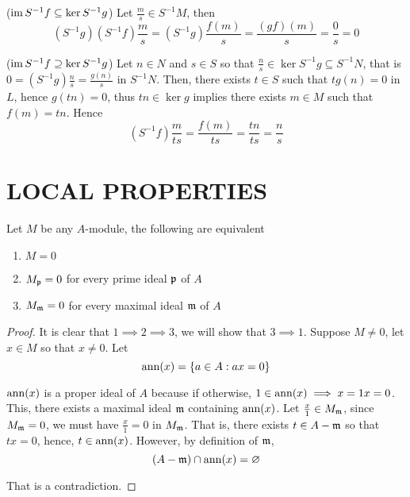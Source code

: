 \begin{longproof}
	($\operatorname{im} S^{-1} f \subseteq \ker S^{-1} g$) Let $\frac{m}{s} \in S^{-1} M$, then 
	$$
		(S^{-1} g) (S^{-1} f)\frac{m}{s} = (S^{-1} g) \frac{f(m)}{s} = \frac{(gf)(m)}{s} = \frac{0}{s} = 0
	$$
	
	($\operatorname{im} S^{-1} f \supseteq \ker S^{-1} g$) Let $n \in N$ and $s \in S$ so that $\frac{n}{s} \in \ker S^{-1} g \subseteq S^{-1} N$, that is $0 = (S^{-1} g) \frac{n}{s} = \frac{g(n)}{s}$ in $S^{-1} N$. Then, there exists $t \in S$ such that $t g(n) = 0$ in $L$, hence $g(tn) = 0$, thus $tn \in \ker g$ implies there exists $m \in M$ such that $f(m) = tn$. Hence
	$$
		(S^{-1} f) \frac{m}{ts} = \frac{f(m)}{ts} = \frac{tn}{ts} = \frac{n}{s}
	$$
\end{longproof}

\begin{proposition}
\end{proposition}

\section{LOCAL PROPERTIES}

\begin{proposition}
	Let $M$ be any $A$-module, the following are equivalent
	\begin{enumerate}
		\item $M = 0$
		\item $M_{\mathfrak{p}} = 0$ for every prime ideal $\mathfrak{p}$ of $A$
		\item $M_{\mathfrak{m}} = 0$ for every maximal ideal $\mathfrak{m}$ of $A$
	\end{enumerate}
\end{proposition}

\begin{proof}
	It is clear that $1 \implies 2 \implies 3$, we will show that $3 \implies 1$. Suppose $M \neq 0$, let $x \in M$ so that $x \neq 0$. Let 
	$$
		\operatorname{ann}(x) = \{a \in A: ax = 0\}
	$$
	
	$\operatorname{ann}(x)$ is a proper ideal of $A$ because if otherwise, $1 \in \operatorname{ann}(x) \implies x = 1x = 0$. This, there exists a maximal ideal $\mathfrak{m}$ containing $\operatorname{ann}(x)$. Let $\frac{x}{1} \in M_{\mathfrak{m}}$, since $M_{\mathfrak{m}} = 0$, we must have $\frac{x}{1} = 0$ in $M_{\mathfrak{m}}$. That is, there exists $t \in A - \mathfrak{m}$ so that $tx = 0$, hence, $t \in \operatorname{ann}(x)$. However, by definition of $\mathfrak{m}$,
	$$
		(A - \mathfrak{m}) \cap \operatorname{ann}(x) = \varnothing
	$$
	
	That is a contradiction.
\end{proof}

